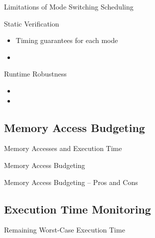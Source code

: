\begin{frame}{Limitations of Mode Switching Scheduling}

\pause
\begin{block}{Static Verification}
\begin{itemize}
    \item<3-> Timing guarantees for each mode
    \item<4-> 
\end{itemize}
\end{block}

\begin{block}{Runtime Robustness}
\begin{itemize}
    \item<5-> 
    \item<6-> 
\end{itemize}
\end{block}

\end{frame}


\subsection{Memory Access Budgeting}

\begin{frame}{Memory Accesses and Execution Time}

\end{frame}

\begin{frame}{Memory Access Budgeting}

\end{frame}


\begin{frame}{Memory Access Budgeting -- Pros and Cons}

\end{frame}

\subsection{Execution Time Monitoring}

\begin{frame}{Remaining Worst-Case Execution Time}

\end{frame}

